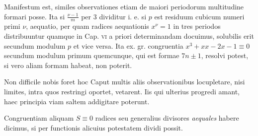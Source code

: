 Manifestum est, similes observationes etiam de maiori periodorum multitudine formari posse. Ita si $\frac{\nu-1}m$ per $3$ dividitur i. e. si $p$ est residuum cubicum numeri primi $\nu$, aequatio, per quam radices aequationis $x^\nu=1$ in tres periodos distribuuntur quamque in Cap. \textsc{vi} a priori determinandam docuimus, solubilis erit secundum modulum $p$ et vice versa. Ita ex. gr. congruentia $x^3+xx-2x-1\equiv0$ secundum modulum primum quemcunque, qui est formae $7n\pm1$, resolvi potest, si vero aliam formam habeat, non poterit.

Non difficile nobis foret hoc Caput multis aliis observationibus locupletare, nisi limites, intra quos restringi oportet, vetarent. Iis qui ulterius progredi amant, haec principia viam saltem addigitare poterunt.

Congruentiam aliquam $S\equiv0$ radices seu generalius divisores \emph{aequales} habere dicimus, si per functionis alicuius potestatem dividi possit.

